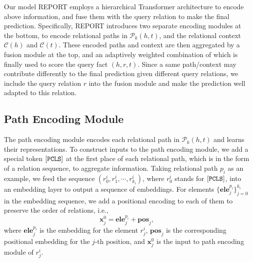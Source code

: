 \documentclass{article}
\begin{document}
Our model REPORT employs a hierarchical Transformer architecture to encode above information, and fuse them with the query relation to make the final prediction. 
Specifically, REPORT introduces two separate encoding modules at the bottom, to encode relational paths in $\mathcal{P}_k(h,t)$, and the relational context $\mathcal{C}(h)$ and $\mathcal{C}(t)$. 
These encoded paths and context are then aggregated by a fusion module at the top, and an adaptively weighted combination of which is finally used to score the query fact $(h,r,t)$. 
Since a same path/context may contribute differently to the final prediction given different query relations, we include the query relation $r$ into the fusion module and make the prediction well adapted to this relation. 






\subsection{Path Encoding Module}
The path encoding module encodes each relational path in $\mathcal{P}_k(h,t)$ and learns their representations.
To construct inputs to the path encoding module, we add a special token
${\small\tt [PCLS]}$ at the first place of each relational path, which is in the form of a relation sequence, to aggregate information.
Taking relational path $p_i$ as an example, we feed the sequence $(r^i_0,r^i_{1},\cdots,r^i_{k_i})$, where $r^i_0$ stands for ${\small\tt [PCLS]}$, into an embedding layer to output a sequence of embeddings.
For elements $\{\mathbf{ele}^{p_i}_j\}_{j=0}^{k_i}$ in the embedding sequence, we add a positional encoding to each of them to preserve the order of relations, i.e.,
\begin{equation}
    \mathbf{x}^{0}_j = \mathbf{ele}^{p_i}_j + \mathbf{pos}_{j},
\end{equation}
where $\mathbf{ele}^{p_i}_j$ is the embedding for the element $r^i_j$, $\mathbf{pos}_{j}$ is the corresponding positional embedding for the $j$-th position, and $\mathbf{x}^{0}_j$ is the input to path encoding module of $r^i_j$.
\end{document}
